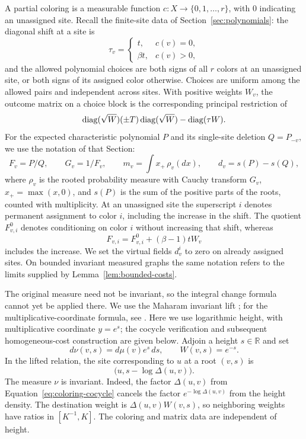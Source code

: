 A partial coloring is a measurable function
$c:X\to\{0,1,\ldots,r\}$, with $0$ indicating an unassigned site.  Recall
the finite-site data of Section~\ref{sec:polynomials}: the diagonal shift
at a site is
\[
 \tau_v=
 \begin{cases}
 t,&c(v)=0,\\
 \beta t,&c(v)>0,
 \end{cases}
\]
and the allowed polynomial choices are both signs of all $r$ colors at an
unassigned site, or both signs of its assigned color otherwise.  Choices
are uniform among the allowed pairs and independent across sites.
With positive weights $W_v$, the outcome
matrix on a choice block is the corresponding principal restriction of
\[
 \operatorname{diag}(\sqrt W)(\pm T)\operatorname{diag}(\sqrt W)-\operatorname{diag}(\tau W).
\]
For the expected characteristic polynomial $P$ and its single-site
deletion $Q=P_{-v}$, we use the notation of that Section:
\[
 F_v=P/Q,\qquad G_v=1/F_v,
 \qquad m_v=\int x_+\,\rho_v(dx),
 \qquad d_v=s(P)-s(Q),
\]
where $\rho_v$ is the rooted probability measure with Cauchy transform
$G_v$, $x_+=\max(x,0)$, and $s(P)$ is the sum of the positive parts of the
roots, counted with multiplicity.  At an unassigned site the superscript
$i$ denotes permanent assignment to color $i$, including the increase in
the shift.  The quotient $F_{v,i}^0$ denotes conditioning on color $i$
without increasing that shift, whereas
\[
 F_{v,i}=F_{v,i}^0+(\beta-1)tW_v
\]
includes the increase.  We set the virtual fields $d_v^{i}$ to zero on
already assigned sites.  On bounded invariant measured graphs the same
notation refers to the limits supplied by Lemma~\ref{lem:bounded-costs}.

The original measure need not be invariant, so the integral change formula
cannot yet be applied there.  We use the Maharam invariant lift
\cite{Mah64}; for the multiplicative-coordinate formula, see
\cite[Section~2, before Theorem~2.1]{RoySamorodnitsky06}.
Here we use logarithmic height, with multiplicative coordinate $y=e^s$;
the cocycle verification and subsequent homogeneous-cost construction are
given below.  Adjoin a height $s\in\mathbb R$ and set
\begin{equation}
 d\nu(v,s)=d\mu(v)e^s\,ds,
 \qquad W(v,s)=e^{-s}.
 \label{eq:coloring-lift}
\end{equation}
In the lifted relation, the site corresponding to $u$ at a root $(v,s)$ is
\begin{equation}
 \bigl(u,s-\log\Delta(u,v)\bigr).
 \label{eq:coloring-height-change}
\end{equation}
The measure $\nu$ is invariant.  Indeed, the factor $\Delta(u,v)$ from
Equation~\eqref{eq:coloring-cocycle} cancels the factor
$e^{-\log\Delta(u,v)}$ from the height density.  The destination weight is
$\Delta(u,v)W(v,s)$, so neighboring weights have ratios in $[K^{-1},K]$.
The coloring and matrix data are independent of height.

